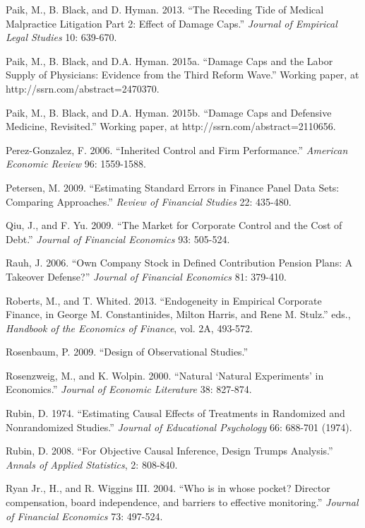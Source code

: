 \noindent Paik, M., B. Black, and D. Hyman. 2013. ``The Receding Tide of Medical Malpractice Litigation Part 2:  Effect of Damage Caps.'' \textit{Journal of Empirical Legal Studies} 10: 639-670.

\noindent Paik, M., B. Black, and D.A. Hyman.  2015a. ``Damage Caps and the Labor Supply of Physicians:  Evidence from the Third Reform Wave.''  Working paper, at http://ssrn.com/abstract=2470370.

\noindent Paik, M., B. Black, and D.A. Hyman.  2015b. ``Damage Caps and Defensive Medicine, Revisited.''  Working paper, at http://ssrn.com/abstract=2110656. 

\noindent Perez-Gonzalez, F. 2006. ``Inherited Control and Firm Performance.''  \textit{American Economic Review} 96: 1559-1588.

\noindent Petersen, M. 2009. ``Estimating Standard Errors in Finance Panel Data Sets:  Comparing Approaches.''  \textit{Review of Financial Studies} 22: 435-480.

\noindent Qiu, J., and F. Yu. 2009. ``The Market for Corporate Control and the Cost of Debt.''  \textit{Journal of Financial Economics} 93: 505-524.

\noindent Rauh, J. 2006. ``Own Company Stock in Defined Contribution Pension Plans:  A Takeover Defense?''  \textit{Journal of Financial Economics} 81: 379-410.

\noindent Roberts, M., and T. Whited. 2013. ``Endogeneity in Empirical Corporate Finance, in George M. Constantinides, Milton Harris, and Rene M. Stulz.'' eds., \textit{Handbook of the Economics of Finance}, vol. 2A, 493-572.

\noindent Rosenbaum, P. 2009. ``Design of Observational Studies.''

\noindent Rosenzweig, M., and K. Wolpin. 2000. ``Natural `Natural Experiments' in Economics.'' \textit{Journal of Economic Literature} 38: 827-874.

\noindent Rubin, D. 1974. ``Estimating Causal Effects of Treatments in Randomized and Nonrandomized Studies.''  \textit{Journal of Educational Psychology} 66: 688-701 (1974).

\noindent Rubin, D. 2008. ``For Objective Causal Inference, Design Trumps Analysis.'' \textit{Annals of Applied Statistics}, 2: 808-840.

\noindent Ryan Jr., H., and R. Wiggins III. 2004. ``Who is in whose pocket? Director compensation, board independence, and barriers to effective monitoring.''  \textit{Journal of Financial Economics} 73: 497-524.

